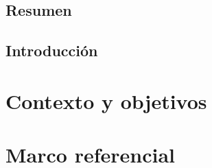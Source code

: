 \documentclass[spanish, a4paper, 12pt, twoside, openany]{book}
\numberwithin{equation}{section} %
\begin{document}
\section*{Resumen}


\newpage
{}
\thispagestyle{empty} %
\section*{Introducción}


\newpage
{} %

\chapter{Contexto y objetivos}
\minitoc%
\clearpage %















\chapter{Marco referencial}
\minitoc%
\clearpage
\end{document}
